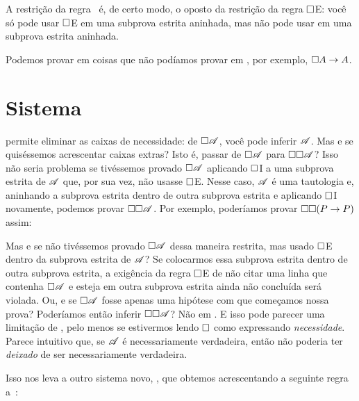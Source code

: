 A restrição da regra~\mlT{} é, de certo modo, o oposto da restrição da regra $\Box$E: você só pode usar $\Box$E em uma subprova estrita aninhada, mas não pode usar \mlT{} em uma subprova estrita aninhada.

Podemos provar em \mlT{} coisas que não podíamos provar em \mlK, por exemplo, $\Box A \rightarrow A$.

\section{Sistema \mlSfour}
\label{S4}

\mlT{} permite eliminar as caixas de necessidade: de $\Box \mathscr{A}$, você pode inferir $\mathscr{A}$. Mas e se quiséssemos acrescentar caixas extras? Isto é, passar de $\Box\mathscr{A}$ para $\Box\Box\mathscr{A}$? Isso não seria problema se tivéssemos provado $\Box\mathscr{A}$ aplicando $\Box$I a uma subprova estrita de $\mathscr{A}$ que, por sua vez, não usasse $\Box$E. Nesse caso, $\mathscr{A}$ é uma tautologia e, aninhando a subprova estrita dentro de outra subprova estrita e aplicando $\Box$I novamente, podemos provar $\Box\Box \mathscr{A}$. Por exemplo, poderíamos provar $\Box\Box (P\rightarrow P)$ assim:
\begin{fitchproof}
		\open
		\AS
		\open
		\AS
		\open
		\AS
		\close
		\close
		\close
\end{fitchproof}
Mas e se não tivéssemos provado $\Box\mathscr{A}$ dessa maneira restrita, mas usado $\Box$E dentro da subprova estrita de $\mathscr{A}$? Se colocarmos essa subprova estrita dentro de outra subprova estrita, a exigência da regra $\Box$E de não citar uma linha que contenha $\Box\mathscr{A}$ e esteja em outra subprova estrita ainda não concluída será violada. Ou, e se $\Box\mathscr{A}$ fosse apenas uma hipótese com que começamos nossa prova? Poderíamos então inferir $\Box\Box\mathscr{A}$? Não em \mlT. E isso pode parecer uma limitação de \mlT{}, pelo menos se estivermos lendo $\Box$ como expressando \emph{necessidade}. Parece intuitivo que, se $\mathscr{A}$ é necessariamente verdadeira, então não poderia ter \emph{deixado} de ser necessariamente verdadeira.

Isso nos leva a outro sistema novo, \mlSfour, que obtemos acrescentando a seguinte regra a~\mlT:

